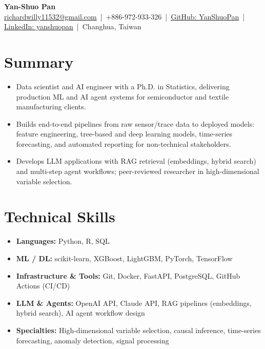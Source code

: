 \documentclass[letterpaper,11pt]{article}
\newcommand{\resumeItem}[1]{\item #1}
\newcommand{\resumeSubHeadingListStart}{\begin{itemize}[leftmargin=0.18in, label={}]}
\newcommand{\resumeSubHeadingListEnd}{\end{itemize}}
\begin{document}

\begin{center}
    {\Huge \textbf{Yan-Shuo Pan}}\\[6pt]
    \href{mailto:richardwilly11532@gmail.com}{richardwilly11532@gmail.com} \,|\,
    +886-972-933-326 \,|\,
    \href{https://github.com/YanShuoPan}{GitHub: YanShuoPan} \,|\,
    \href{https://www.linkedin.com/in/yanshuopan}{LinkedIn: yanshuopan} \,|\,
    Changhua, Taiwan
\end{center}


\section{Summary}
\begin{itemize}[leftmargin=0.2in, itemsep=1pt]
    \item Data scientist and AI engineer with a Ph.D. in Statistics, delivering production ML and AI agent systems for semiconductor and textile manufacturing clients.
    \item Builds end-to-end pipelines from raw sensor/trace data to deployed models: feature engineering, tree-based and deep learning models, time-series forecasting, and automated reporting for non-technical stakeholders.
    \item Develops LLM applications with RAG retrieval (embeddings, hybrid search) and multi-step agent workflows; peer-reviewed researcher in high-dimensional variable selection.
\end{itemize}



\section{Technical Skills}

\resumeSubHeadingListStart
\resumeItem{\textbf{Languages:} Python, R, SQL}
\resumeItem{\textbf{ML / DL:} scikit-learn, XGBoost, LightGBM, PyTorch, TensorFlow}
\resumeItem{\textbf{Infrastructure \& Tools:} Git, Docker, FastAPI, PostgreSQL, GitHub Actions (CI/CD)}
\resumeItem{\textbf{LLM \& Agents:} OpenAI API, Claude API, RAG pipelines (embeddings, hybrid search), AI agent workflow design}
\resumeItem{\textbf{Specialties:} High-dimensional variable selection, causal inference, time-series forecasting, anomaly detection, signal processing}
\resumeSubHeadingListEnd
\end{document}
